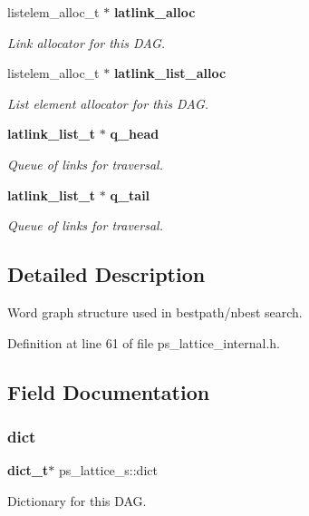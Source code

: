 \begin{DoxyCompactItemize}
listelem\+\_\+alloc\+\_\+t $\ast$ \textbf{ latlink\+\_\+alloc}
\begin{DoxyCompactList}\small\item\em Link allocator for this D\+AG. \end{DoxyCompactList}\item 
listelem\+\_\+alloc\+\_\+t $\ast$ \textbf{ latlink\+\_\+list\+\_\+alloc}
\begin{DoxyCompactList}\small\item\em List element allocator for this D\+AG. \end{DoxyCompactList}\item 
\textbf{ latlink\+\_\+list\+\_\+t} $\ast$ \textbf{ q\+\_\+head}
\begin{DoxyCompactList}\small\item\em Queue of links for traversal. \end{DoxyCompactList}\item 
\textbf{ latlink\+\_\+list\+\_\+t} $\ast$ \textbf{ q\+\_\+tail}
\begin{DoxyCompactList}\small\item\em Queue of links for traversal. \end{DoxyCompactList}\end{DoxyCompactItemize}


\subsection{Detailed Description}
Word graph structure used in bestpath/nbest search. 

Definition at line 61 of file ps\+\_\+lattice\+\_\+internal.\+h.



\subsection{Field Documentation}
\mbox{\label{structps__lattice__s_a71865c59fae65743ef3c6b5aceb17da6}} 
\subsubsection{dict}
{\footnotesize\ttfamily \textbf{ dict\+\_\+t}$\ast$ ps\+\_\+lattice\+\_\+s\+::dict}



Dictionary for this D\+AG. 



